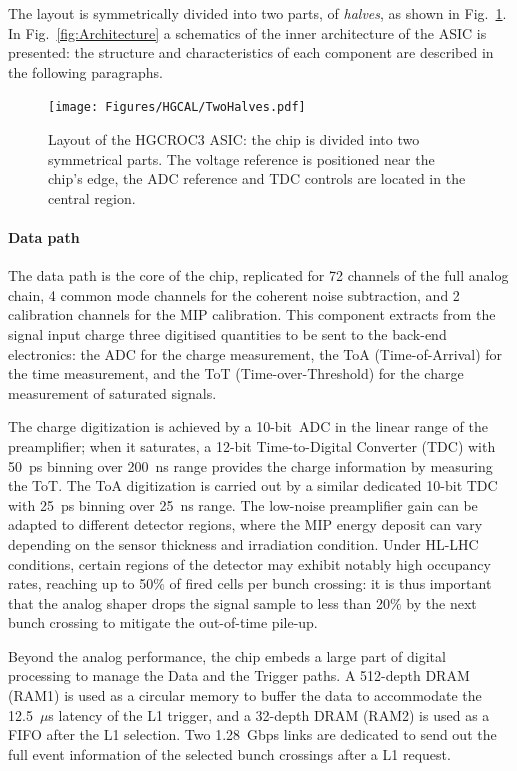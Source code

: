 The layout is symmetrically divided into two parts, of \textit{halves}, as shown in Fig.~\ref{fig:TowHalves}.
In Fig.~\ref{fig:Architecture} a schematics of the inner architecture of the ASIC is presented: the structure and characteristics of each component are described in the following paragraphs.

\begin{figure}
    \centering
    \texttt{[image: Figures/HGCAL/TwoHalves.pdf]}
    \caption{Layout of the HGCROC3 ASIC: the chip is divided into two symmetrical parts. The voltage reference is positioned near the chip's edge, the ADC reference and TDC controls are located in the central region.}
    \label{fig:TowHalves}
\end{figure}

\paragraph{Data path}
The data path is the core of the chip, replicated for 72 channels of the full analog chain, 4 common mode channels for the coherent noise subtraction, and 2 calibration channels for the MIP calibration. This component extracts from the signal input charge three digitised quantities to be sent to the back-end electronics: the ADC for the charge measurement, the ToA (Time-of-Arrival) for the time measurement, and the ToT (Time-over-Threshold) for the charge measurement of saturated signals. 

The charge digitization is achieved by a 10-bit~ADC in the linear range of the preamplifier; when it saturates, a 12-bit Time-to-Digital Converter (TDC) with 50~ps binning over 200~ns range provides the charge information by measuring the ToT. The ToA digitization is carried out by a similar dedicated 10-bit TDC with 25~ps binning over 25~ns range.
The low-noise preamplifier gain can be adapted to different detector regions, where the MIP energy deposit can vary depending on the sensor thickness and irradiation condition.
Under HL-LHC conditions, certain regions of the detector may exhibit notably high occupancy rates, reaching up to 50$\%$ of fired cells per bunch crossing: it is thus important that the analog shaper drops the signal sample to less than 20$\%$ by the next bunch crossing to mitigate the out-of-time pile-up.

Beyond the analog performance, the chip embeds a large part of digital processing to manage the Data and the Trigger paths. A 512-depth DRAM (RAM1) is used as a circular memory to buffer the data to accommodate the 12.5~$\mu$s latency of the L1 trigger, and a 32-depth DRAM (RAM2) is used as a FIFO after the L1 selection.
Two 1.28~Gbps links are dedicated to send out the full event information of the selected bunch crossings after a L1 request.

